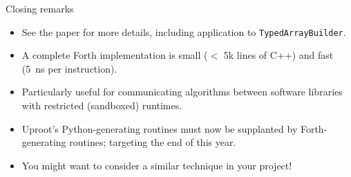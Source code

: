 \documentclass[aspectratio=169]{beamer}
\begin{document}
\begin{frame}{Closing remarks}
\Large
\vspace{0.25 cm}
\begin{itemize}[<+-|alert@+>]\setlength{\itemsep}{0.2 cm}
\item See the paper for more details, including application to \texttt{TypedArrayBuilder}.
\item A complete Forth implementation is small ($<$ 5k lines of C++) and fast (5~ns per instruction).
\item Particularly useful for communicating algorithms between software libraries with restricted (sandboxed) runtimes.
\item Uproot's Python-generating routines must now be supplanted by Forth-generating routines; targeting the end of this year.
\item You might want to consider a similar technique in your project!
\end{itemize}
\end{frame}
\end{document}
